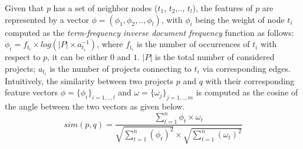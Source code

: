 Given that $p$ has a set of neighbor nodes ($t_{1}$, $t_{2}$,.., 
$t_{l}$), the features of $p$ are represented by a vector 
$\phi=(\phi_{1},\phi_{2},..,\phi_{l})$, with $\phi_{i}$ being the weight of 
node $t_{i}$ computed as the \emph{term-frequency inverse document 
frequency} function as follows: $\phi_{i} = f_{t_{i}} \times log( \left | P 
\right | \times a_{t_{i}}^{-1} )$, where $f_{t_{i}}$ is the number of 
occurrences of $t_{i}$ with respect to $p$, it can be either $0$ and $1$. 
$\left | P \right |$ is the total number of 
considered 
projects; $a_{t_{i}}$ is the number of projects connecting to $t_{i}$ 
via corresponding edges.
%
Intuitively, the similarity between two projects $p$ and $q$ with their corresponding feature vectors $\phi=\{\phi_{i}\}_{i=1,..,l}$ and $\omega=\{\omega_{j}\}_{j=1,..,m}$ is computed as the cosine of the angle between the two vectors as given below. %
\begin{equation} \label{eqn:VsmSim}
sim(p,q)=\frac{\sum_{t=1}^{n}\phi_{t}\times \omega_{t}}{\sqrt{\sum_{t=1}^{n}(\phi_{t})^{2} }\times \sqrt{\sum_{t=1}^{n}(\omega_{t})^{2}}} 
\end{equation}

